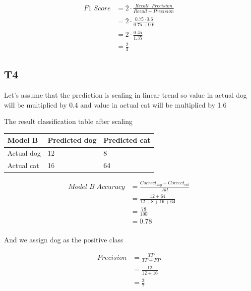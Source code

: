 \documentclass[12pt, a4paper]{article}
\begin{document}
\begin{equation}
    \label{F1 Dog}
    \begin{split}
        F1\;Score & = 2 \cdot \frac{Recall \cdot Precision}{Recall + Precision} \\
                    & = 2 \cdot \frac{0.75 \cdot 0.6}{0.75 + 0.6} \\
                    & = 2 \cdot \frac{0.45}{1.35} \\
                    & = \frac{2}{3}
    \end{split}
\end{equation}

\subsection{T4}

Let's assume that the prediction is scaling in linear trend so value in actual dog will be multiplied by 0.4 and value in actual cat will be multiplied by 1.6

The result classification table after scaling
\begin{center}
    \begin{tabular}{| m{5em} | m{7em} | m{7em} |} 
        \hline
        Model B & Predicted dog & Predicted cat \\
        \hline\hline
        Actual dog & 12 & 8 \\ 
        \hline
        Actual cat & 16 & 64 \\
        \hline
    \end{tabular}
\end{center}

\begin{equation}
    \label{Model B Accuracy}
    \begin{split}
        Model\;B\;Accuracy & = \frac{Correct_{dog} + Correct_{cat}}{All} \\
                            & = \frac{12 + 64}{12 + 8 + 16 + 64} \\
                            & = \frac{78}{100} \\
                            & = 0.78 \\
    \end{split}
\end{equation}

And we assign dog as the positive class

\begin{equation}
    \label{Precision Dog B}
    \begin{split}
        Precision & = \frac{TP}{TP + FP} \\
                    & = \frac{12}{12 + 16} \\
                    & = \frac{3}{7} \\
    \end{split}
\end{equation}
\end{document}
